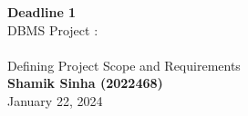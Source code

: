 \begin{titlepage}
    \begin{center}
    {\fontsize{35}{48}\selectfont \bfseries Deadline 1} 
    \\\vspace{20pt}
    {\LARGE DBMS Project : \\
    \\\vspace{10pt}
    Defining Project Scope and Requirements} \\
    \vspace{20pt}
    \textbf{{\fontsize{18}{22}\selectfont Shamik Sinha (2022468)}}
        \vspace{8pt}
        \\ {\fontsize{16}{19.2}\selectfont January 22, 2024}
    \end{center}
\end{titlepage}